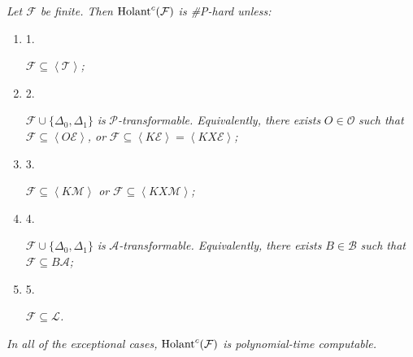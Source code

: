 \documentclass[10pt,a4paper]{article}
\begin{document}
\emph{Let $\mathcal{F}$ be finite. Then $\textup{{Holant}}^{c}(\mathcal{F})$ is \#P-hard unless:}\par


\begin{enumerate}


\item[] 
1. 


$\mathcal{F}\subseteq\left\langle\mathcal{T}\right\rangle$\emph{;}\par





\item[] 
2. 


$\mathcal{F}\cup\{\Delta_{0},\Delta_{1}\}$\emph{ is }$\mathscr{P}$\emph{-transformable. Equivalently, there exists }$O\in\mathscr{O}$\emph{ such that }$\mathcal{F}\subseteq\left\langle O\mathcal{E}\right\rangle$\emph{, or }$\mathcal{F}\subseteq\left\langle K\mathcal{E}\right\rangle=\left\langle KX\mathcal{E}\right\rangle$\emph{;}\par





\item[] 
3. 


$\mathcal{F}\subseteq\left\langle K\mathcal{M}\right\rangle$\emph{ or }$\mathcal{F}\subseteq\left\langle KX\mathcal{M}\right\rangle$\emph{;}\par





\item[] 
4. 


$\mathcal{F}\cup\{\Delta_{0},\Delta_{1}\}$\emph{ is }$\mathscr{A}$\emph{-transformable. Equivalently, there exists }$B\in\mathcal{B}$\emph{ such that }$\mathcal{F}\subseteq B\mathscr{A}$\emph{;}\par





\item[] 
5. 


$\mathcal{F}\subseteq\mathscr{L}$\emph{.}\par





\end{enumerate}


\emph{In all of the exceptional cases, $\textup{{Holant}}^{c}(\mathcal{F})$ is polynomial-time computable.}\par
\end{document}
